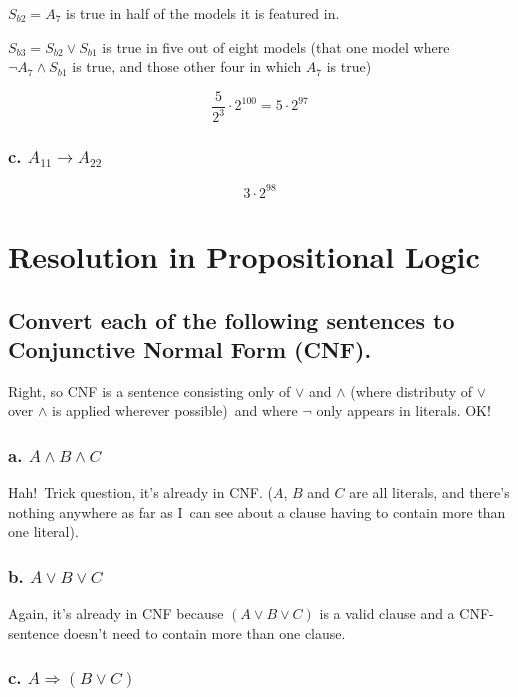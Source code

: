\documentclass{article}
\begin{document}
$S_{b2}=A_{7}$ is true in half of the models it is featured in.

$S_{b3}=S_{b2}\vee S_{b1}$ is true in five out of eight models (that one
model where $\lnot A_{7}\wedge S_{b1}$ is true, and those other four in
which $A_{7}$ is true)

\[
\dfrac{5}{2^{3}}\cdot 2^{100}=5\cdot 2^{97}
\]

\subsubsection{c. $A_{11}\rightarrow A_{22}$}

\[
3\cdot 2^{98}
\]

\section{Resolution in Propositional Logic}

\subsection{Convert each of the following sentences to Conjunctive Normal
Form (CNF).}

Right, so CNF is a sentence consisting only of $\vee $ and $\wedge $ (where
distributy of $\vee $ over $\wedge $ is applied wherever possible)\ and
where $\lnot $ only appears in literals. OK!

\subsubsection{a. $A\wedge B\wedge C$}

Hah!\ Trick question, it's already in CNF. ($A$, $B$ and $C$ are all
literals, and there's nothing anywhere as far as I\ can see about a clause
having to contain more than one literal).

\subsubsection{b. $A\vee B\vee C$}

Again, it's already in CNF because $\left( A\vee B\vee C\right) $ is a valid
clause and a CNF-sentence doesn't need to contain more than one clause.

\subsubsection{c. $A\Rightarrow \left( B\vee C\right) $}
\end{document}

